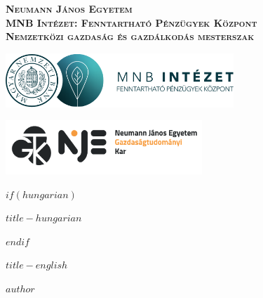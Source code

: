 \begin{titlepage}
\clearpage
\thispagestyle{empty}
\vspace*{0.1cm}
\begin{center}
    
    {\bfseries\fontsize{16}{22}\selectfont \textsc{Neumann János Egyetem}} \\ {\bfseries\fontsize{16}{22}\selectfont \textsc{MNB Intézet: Fenntartható Pénzügyek Központ }} \\ {\bfseries\fontsize{16}{22}\selectfont \textsc{Nemzetközi gazdaság és gazdálkodás mesterszak}}
\end{center}
\vspace*{1cm}
\begin{center}
   \includegraphics[height=0.8in]{_extensions/mnb_logo.png}

\end{center}
\vspace*{1cm}
\begin{center}
   \includegraphics[height=0.8in]{_extensions/neumann.png}

\end{center}
$if(hungarian)$
\vspace*{1cm}
\begin{center}
    
    {\bfseries\fontsize{18}{22}\selectfont \textsc{$title-hungarian$}}
\end{center}

$endif$

\vspace*{1cm}
\begin{center}
    
    {\bfseries\fontsize{18}{22}\selectfont \textsc{$title-english$}}
\end{center}

\vspace*{1cm}
\begin{center}
    
    {\fontsize{16}{22}\selectfont \textsc{$author$}}


\end{center}
\end{titlepage}
